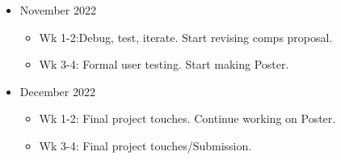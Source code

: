 \documentclass[11pt,twocolumn]{article}
\begin{document}
\begin{itemize}
   \item November 2022
   \begin{itemize}
     \item Wk 1-2:Debug, test, iterate. Start revising comps proposal.
     \item Wk 3-4: Formal user testing. Start making Poster.
   \end{itemize}
   
   \item December 2022
   \begin{itemize}
     \item Wk 1-2: Final project touches. Continue working on Poster. 
     \item Wk 3-4: Final project touches/Submission.
   \end{itemize}
   
\end{itemize}


\printbibliography 
\end{document}
